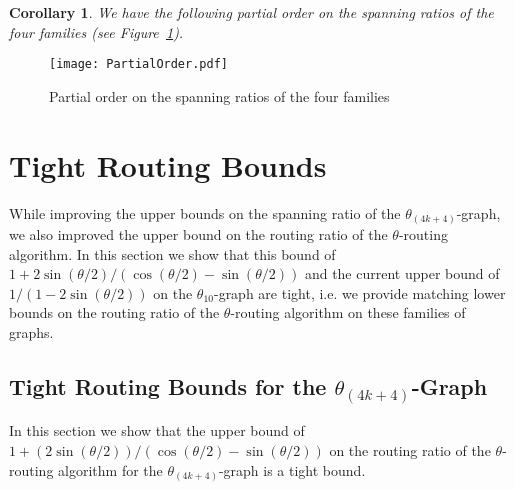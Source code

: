 \documentclass[12pt]{article}
\newtheorem{coro}[defin]{Corollary}
\newenvironment{corollary}{\begin{coro} \sl}{\end{coro}}
\newcommand{\Graph}[1]{\ensuremath{\theta_{(4 k + #1)}}-Graph\xspace}
\newcommand{\graph}[1]{\ensuremath{\theta_{(4 k + #1)}}-graph\xspace}
\begin{document}
\begin{corollary}
  We have the following partial order on the spanning ratios of the four families (see Figure~\ref{figure partial order}).
\end{corollary}

\begin{figure}[ht]
  \centering
  \texttt{[image: PartialOrder.pdf]}
  \caption{Partial order on the spanning ratios of the four families}
  \label{figure partial order}
\end{figure}


\section{Tight Routing Bounds}
While improving the upper bounds on the spanning ratio of the \graph{4}, we also improved the upper bound on the routing ratio of the $\theta$-routing algorithm. In this section we show that this bound of $1 + 2 \sin (\theta/2) / \left( \cos (\theta/2) - \sin (\theta/2) \right)$ and the current upper bound of $1 / \left( 1 - 2 \sin (\theta/2) \right)$ on the $\theta_{10}$-graph are tight, i.e. we provide matching lower bounds on the routing ratio of the $\theta$-routing algorithm on these families of graphs. 


\subsection{Tight Routing Bounds for the \Graph{4}}
In this section we show that the upper bound of $1 + (2 \sin (\theta/2)) / (\cos (\theta/2) - \sin (\theta/2))$ on the routing ratio of the $\theta$-routing algorithm for the \graph{4} is a tight bound. 
\end{document}
